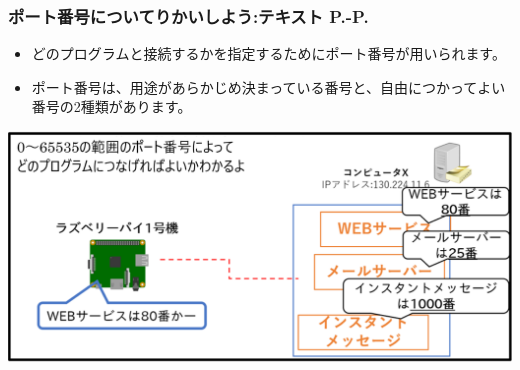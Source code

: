 \documentclass[dvipdfmx]{beamer}
\begin{document}
\begin{frame}[fragile]
	\frametitle{\large{ポート番号についてりかいしよう:テキスト P.\pageref{1:P:port}-P.\pageref{1:P:DNS}}~~~}
            \begin{itemize}
                \item どのプログラムと接続するかを指定するためにポート番号が用いられます。
                \item ポート番号は、用途があらかじめ決まっている番号と、自由につかってよい番号の2種類があります。
            \end{itemize}
			\begin{minipage}{\textwidth}
                {\upshape
                  \includegraphics[width=\textwidth]{slide07-img012.png}}
            \end{minipage}
\end{frame}
\end{document}
